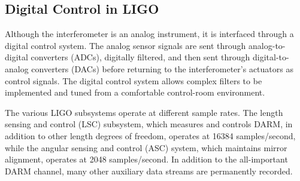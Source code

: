 





\subsection{Digital Control in LIGO}
Although the interferometer is an analog instrument, it is interfaced
through a digital control system. The analog sensor signals are sent
through analog-to-digital converters (ADCs), digitally filtered, and
then sent through digital-to-analog converters (DACs) before returning
to the interferometer's actuators as control signals. The 
digital control system allows complex filters to be implemented and
tuned from a comfortable control-room environment.

The various LIGO subsystems operate at different sample rates.  The
length sensing and control (LSC) subsystem, which measures and
controls DARM, in addition to other length degrees of freedom,
operates at 16384 samples/second, while the angular sensing and
control (ASC) system, which maintains mirror alignment, operates at
2048 samples/second.  In addition to the all-important DARM channel,
many other auxiliary data streams are permanently recorded.

